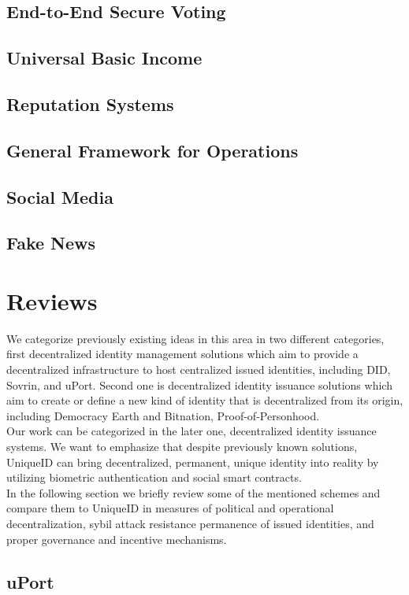 \documentclass{article}
\begin{document}
\subsection{End-to-End Secure Voting}
\subsection{Universal Basic Income}
\subsection{Reputation Systems}
\subsection{General Framework for Operations}
\subsection{Social Media}
\subsection{Fake News}

\section{ Reviews}
We categorize previously existing ideas in this area in two different categories, first decentralized identity management solutions which aim to provide a decentralized infrastructure to host centralized issued identities, including DID, Sovrin, and uPort. Second one is decentralized identity issuance solutions which aim to create or define a new kind of identity that is decentralized from its origin, including Democracy Earth and Bitnation, Proof-of-Personhood.\\
Our work can be categorized in the later one, decentralized identity issuance systems. We want to emphasize that despite previously known solutions, UniqueID can bring decentralized, permanent, unique identity into reality by utilizing biometric authentication and social smart contracts. \\
In the following section we briefly review some of the mentioned schemes and compare them to UniqueID in measures of political and operational decentralization, sybil attack resistance  permanence of issued identities, and proper governance and incentive mechanisms. 

\subsection{uPort}
\end{document}

